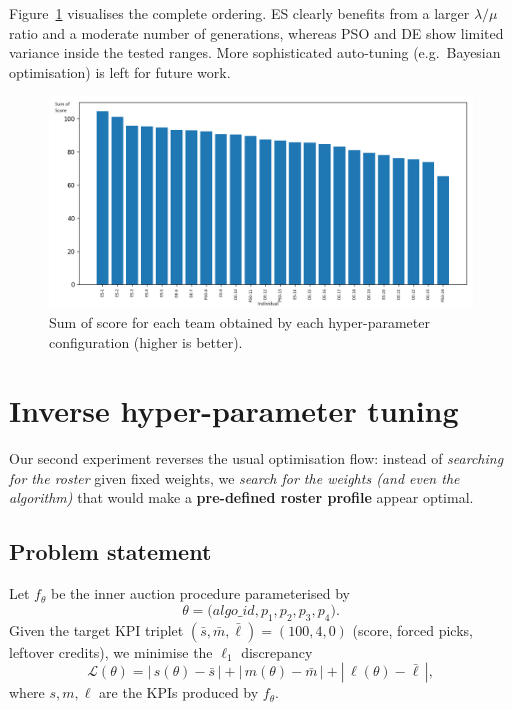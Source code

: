\documentclass[sigconf]{acmart}
\begin{document}
	Figure~\ref{fig:tuning-bars} visualises the complete ordering.  ES
	clearly benefits from a larger $\lambda/\mu$ ratio and a moderate
	number of generations, whereas PSO and DE show limited variance inside
	the tested ranges.  More sophisticated auto-tuning (e.g.\ Bayesian
	optimisation) is left for future work.
	
	\begin{figure}[H]
		\centering
		\includegraphics[width=.9\linewidth]{plot/hyperparam_plot.png}
		\caption{Sum of score for each team obtained by each hyper-parameter configuration
			(higher is better).}
		\label{fig:tuning-bars}
	\end{figure}
	\section{Inverse hyper-parameter tuning}
	\label{sec:inverse}
	
	Our second experiment reverses the usual optimisation flow: instead of
	\emph{searching for the roster} given fixed weights, we
	\emph{search for the weights (and even the algorithm)}
	that would make a \textbf{pre-defined roster profile}
	appear optimal.
	
	\subsection{Problem statement}
	Let $f_\theta$ be the inner auction procedure
	parameterised by
	\[
	\theta=\bigl(\textit{algo\_id},p_1,p_2,p_3,p_4\bigr).
	\]
	Given the target KPI triplet
	$(\bar s,\bar m,\bar \ell)=(100,4,0)$
	(score, forced picks, leftover credits),
	we minimise the $\ell_1$ discrepancy
	\[
	\mathcal L(\theta)
	=\left\lvert\,s(\theta)-\bar s\,\right\rvert
	+\left\lvert\,m(\theta)-\bar m\,\right\rvert
	+\left\lvert\,\ell(\theta)-\bar \ell\,\right\rvert,
	\tag{1}\label{eq:loss}
	\]
	where $s,m,\ell$ are the KPIs produced by $f_\theta$.
	
\end{document}
